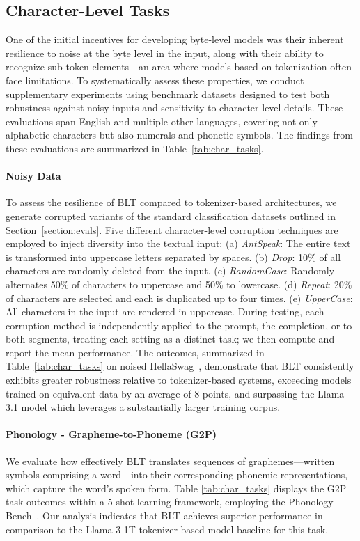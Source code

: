 \subsection{Character-Level Tasks}

One of the initial incentives for developing byte-level models was their inherent resilience to noise at the byte level in the input, along with their ability to recognize sub-token elements—an area where models based on tokenization often face limitations. To systematically assess these properties, we conduct supplementary experiments using benchmark datasets designed to test both robustness against noisy inputs and sensitivity to character-level details. These evaluations span English and multiple other languages, covering not only alphabetic characters but also numerals and phonetic symbols. The findings from these evaluations are summarized in Table~\ref{tab:char_tasks}.

\paragraph{Noisy Data} To assess the resilience of {\textsc BLT} compared to tokenizer-based architectures, we generate corrupted variants of the standard classification datasets outlined in Section~\ref{section:evals}. Five different character-level corruption techniques are employed to inject diversity into the textual input: (a) \textit{AntSpeak}: The entire text is transformed into uppercase letters separated by spaces. (b) \textit{Drop}: 10\% of all characters are randomly deleted from the input. (c) \textit{RandomCase}: Randomly alternates 50\% of characters to uppercase and 50\% to lowercase. (d) \textit{Repeat}: 20\% of characters are selected and each is duplicated up to four times. (e) \textit{UpperCase}: All characters in the input are rendered in uppercase. During testing, each corruption method is independently applied to the prompt, the completion, or to both segments, treating each setting as a distinct task; we then compute and report the mean performance. The outcomes, summarized in Table~\ref{tab:char_tasks} on noised HellaSwag~\citep{Eval_hellaswag}, demonstrate that {\textsc BLT} consistently exhibits greater robustness relative to tokenizer-based systems, exceeding models trained on equivalent data by an average of 8 points, and surpassing the Llama 3.1 model which leverages a substantially larger training corpus.

\paragraph{Phonology - Grapheme-to-Phoneme (G2P)} We evaluate how effectively {\textsc BLT} translates sequences of graphemes—written symbols comprising a word—into their corresponding phonemic representations, which capture the word’s spoken form. Table \ref{tab:char_tasks} displays the G2P task outcomes within a 5-shot learning framework, employing the Phonology Bench~\citep{suvarna2024phonologybench}. Our analysis indicates that {\textsc BLT} achieves superior performance in comparison to the Llama 3 1T tokenizer-based model baseline for this task.

